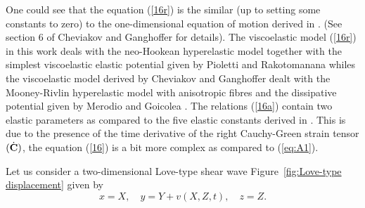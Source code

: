 \documentclass[11pt,letter,subeqn,fleqn]{article}
\numberwithin{equation}{section}
\numberwithin{table}{section}
\numberwithin{figure}{section}
\def\vec#1{{\boldsymbol{\rm #1}}} %
\def\vec#1{{\boldsymbol{\rm #1}}} %
\begin{document}
One could see that the equation (\ref{16r}) is the similar (up to setting some constants to zero) to the one-dimensional equation of motion derived in \cite{cheviakov2016one}. (See section 6 of  Cheviakov and Ganghoffer \cite{cheviakov2016one} for details). The viscoelastic model (\ref{16r}) in this work deals with the neo-Hookean hyperelastic model together with the simplest viscoelastic elastic potential given by Pioletti and Rakotomanana \cite{pioletti2000non} whiles the viscoelastic model derived by Cheviakov and Ganghoffer \cite{cheviakov2016one} dealt with the Mooney-Rivlin hyperelastic model with anisotropic fibres and the dissipative potential given by Merodio and Goicolea \cite{merodio2007thermodynamically}.
The relations (\ref{16a}) contain two elastic parameters as compared to the five elastic constants derived in \cite{cheviakov2016one}. This is due to the presence of the time derivative of the right Cauchy-Green strain tensor $(\dot{\vec{C}})$, the equation (\ref{16}) is a bit more complex as compared to (\ref{eq:A1}).

Let us consider a two-dimensional Love-type shear wave Figure~\ref{fig:Love-type displacement} given by
\begin{equation*}
x=X, \quad y=Y+v(X,Z,t), \quad z=Z.
\end{equation*}
\end{document}
